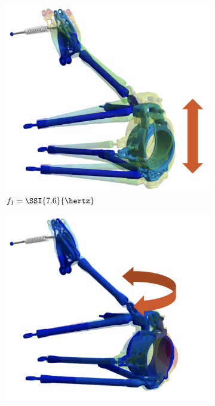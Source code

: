 \begin{figure}[htb]
  \centering
  \begin{subfigure}[c]{0.225\textwidth}
    \centering
    \includegraphics[width=1.0\linewidth]{figures/chapter_4/suspension_mode_1}
    \caption{$f_1 = \SSI{7.6}{\hertz}$}
  \end{subfigure}
  \begin{subfigure}[c]{0.225\textwidth}
    \centering
    \includegraphics[width=1.0\linewidth]{figures/chapter_4/suspension_mode_2}

\end{subfigure}
\end{figure}
